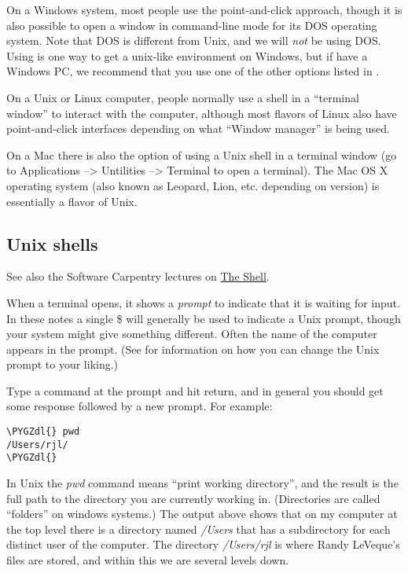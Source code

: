 \documentclass[letterpaper,10pt,english]{sphinxmanual}
\def\PYGZdl{\char`\$}
\begin{document}
On a Windows system, most people use the point-and-click approach,
though it is also possible to open a window in command-line mode
for its DOS operating system. Note that DOS is different from Unix, and
we will \emph{not} be using DOS.  Using  is one way to get a
unix-like environment on Windows, but if have a Windows PC, we
recommend that you use one of the other options listed in
{\hyperref[software_installation:software\string-installation]{}}.

On a Unix or Linux computer, people normally use a shell in a ``terminal
window'' to interact with the computer, although most flavors of Linux also
have point-and-click interfaces depending on what ``Window manager'' is being
used.

On a Mac there is also the option of using a Unix shell in a terminal window
(go to Applications --\textgreater{} Untilities --\textgreater{} Terminal to open a terminal).
The Mac OS X operating system (also known as Leopard, Lion,
etc. depending on version) is essentially a flavor of Unix.


\subsection{Unix shells}
\label{shells:unix-shells}
See also the Software Carpentry lectures on \href{http://software-carpentry.org/4\_0/shell/index.html}{The Shell}.

When a terminal opens, it shows a \emph{prompt} to indicate that it is waiting
for input. In these notes a single \$ will generally be used to indicate a
Unix prompt, though your system might give something different.  Often the
name of the computer appears in the prompt.   (See {\hyperref[unix:prompt]{}} for
information on how you can change the Unix prompt to your liking.)

Type a command at the prompt and hit return, and in general you should get
some response followed by a new prompt.  For example:

\begin{Verbatim}[commandchars=\\\{\}]
\PYGZdl{} pwd
/Users/rjl/
\PYGZdl{}
\end{Verbatim}

In Unix the \emph{pwd} command means ``print working directory'', and the result is
the full path to the directory you are currently working in.  (Directories
are called ``folders'' on windows systems.)  The output above shows that on my
computer at the top level there is a directory named \emph{/Users} that has a
subdirectory for each distinct user of the computer.  The directory
\emph{/Users/rjl} is where Randy LeVeque's files are stored, and within this we
are several levels down.
\end{document}
